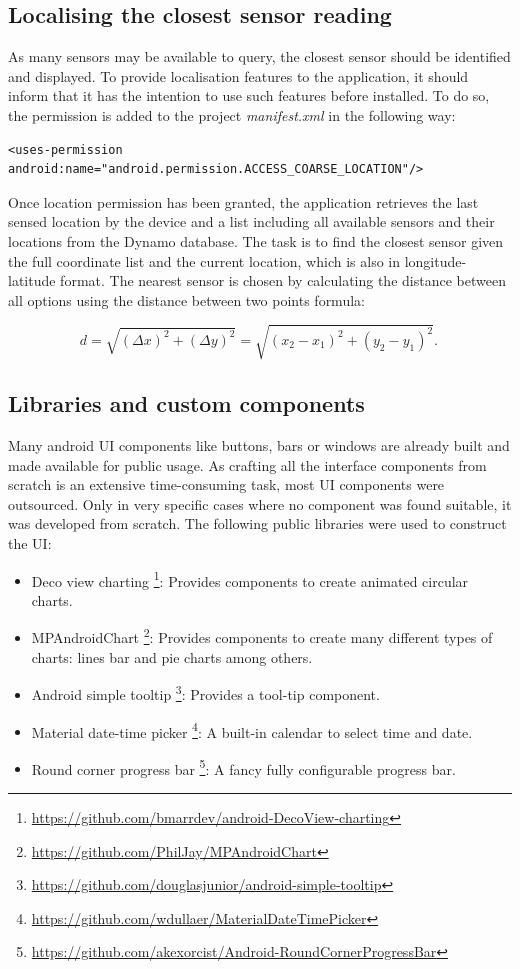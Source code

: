 \subsection{Localising the closest sensor reading}
As many sensors may be available to query, the closest sensor should be identified and displayed. To provide localisation features to the application, it should inform that it has the intention to use such features before installed. To do so, the permission is added to the project \textit{manifest.xml} in the following way: \bigskip

{\centering
\begin{BVerbatim}
<uses-permission android:name="android.permission.ACCESS_COARSE_LOCATION"/>
\end{BVerbatim}
\par
}
\bigskip

Once location permission has been granted, the application retrieves the last sensed location by the device and a list including all available sensors and their locations from the Dynamo database. The task is to find the closest sensor given the full coordinate list and the current location, which is also in longitude-latitude format. The nearest sensor is chosen by calculating the distance between all options using the distance between two points formula: 

\begin{equation}
d={\sqrt {(\Delta x)^{2}+(\Delta y)^{2}}}={\sqrt {(x_{2}-x_{1})^{2}+(y_{2}-y_{1})^{2}}}.\,
\end{equation}

\subsection{Libraries and custom components}
Many android UI components like buttons, bars or windows are already built and made available for public usage. As crafting all the interface components from scratch is an extensive time-consuming task, most UI components were outsourced. Only in very specific cases where no component was found suitable, it was developed from scratch. 
The following public libraries were used to construct the UI:
\begin{itemize}
    \item Deco view charting \footnote{\url{https://github.com/bmarrdev/android-DecoView-charting}}: Provides components to create animated circular charts.
    \item MPAndroidChart \footnote{\url{https://github.com/PhilJay/MPAndroidChart}}: Provides components to create many different types of charts: lines bar and pie charts among others.
    \item Android simple tooltip \footnote{\url{https://github.com/douglasjunior/android-simple-tooltip}}: Provides a tool-tip component.
	\item Material date-time picker \footnote{\url{https://github.com/wdullaer/MaterialDateTimePicker}}: A built-in calendar to select time and date.
  \item Round corner progress bar \footnote{\url{https://github.com/akexorcist/Android-RoundCornerProgressBar}}: A fancy fully configurable progress bar.
\end{itemize}

